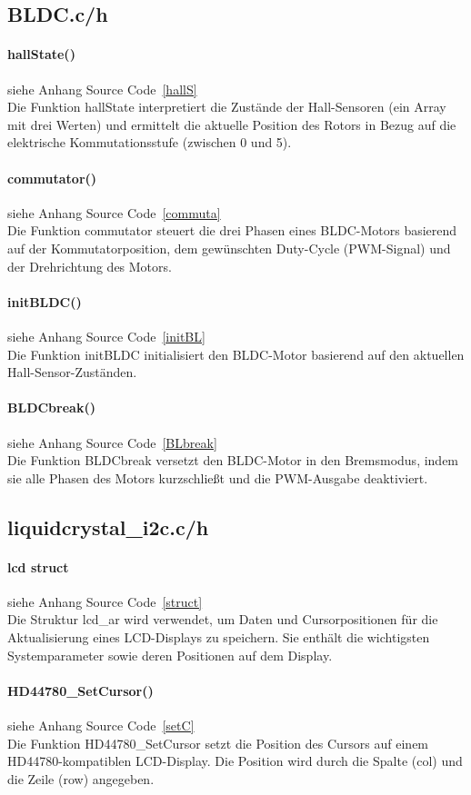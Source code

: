\documentclass[paper=a4,11pt]{scrreprt}
\begin{document}
\subsection{BLDC.c/h}
\paragraph{\textbf{hallState()}} siehe Anhang Source Code~\ref{hallS}\\
Die Funktion hallState interpretiert die Zustände der Hall-Sensoren (ein Array mit drei Werten) und ermittelt die aktuelle Position des Rotors in Bezug auf die elektrische Kommutationsstufe (zwischen 0 und 5).
\paragraph{\textbf{commutator()}} siehe Anhang Source Code~\ref{commuta}\\
Die Funktion commutator steuert die drei Phasen eines BLDC-Motors basierend auf der Kommutatorposition, dem gewünschten Duty-Cycle (PWM-Signal) und der Drehrichtung des Motors.
\paragraph{\textbf{initBLDC()}} siehe Anhang Source Code~\ref{initBL}\\
Die Funktion initBLDC initialisiert den BLDC-Motor basierend auf den aktuellen Hall-Sensor-Zuständen.
\paragraph{\textbf{BLDCbreak()}} siehe Anhang Source Code~\ref{BLbreak}\\
Die Funktion BLDCbreak versetzt den BLDC-Motor in den Bremsmodus, indem sie alle Phasen des Motors kurzschließt und die PWM-Ausgabe deaktiviert.
\subsection{liquidcrystal\_i2c.c/h}
\paragraph{\textbf{lcd struct}} siehe Anhang Source Code~\ref{struct}\\
Die Struktur lcd\_ar wird verwendet, um Daten und Cursorpositionen für die Aktualisierung eines LCD-Displays zu speichern. Sie enthält die wichtigsten Systemparameter sowie deren Positionen auf dem Display.
\paragraph{\textbf{HD44780\_SetCursor()}} siehe Anhang Source Code~\ref{setC}\\
Die Funktion HD44780\_SetCursor setzt die Position des Cursors auf einem HD44780-kompatiblen LCD-Display. Die Position wird durch die Spalte (col) und die Zeile (row) angegeben.
\end{document}
